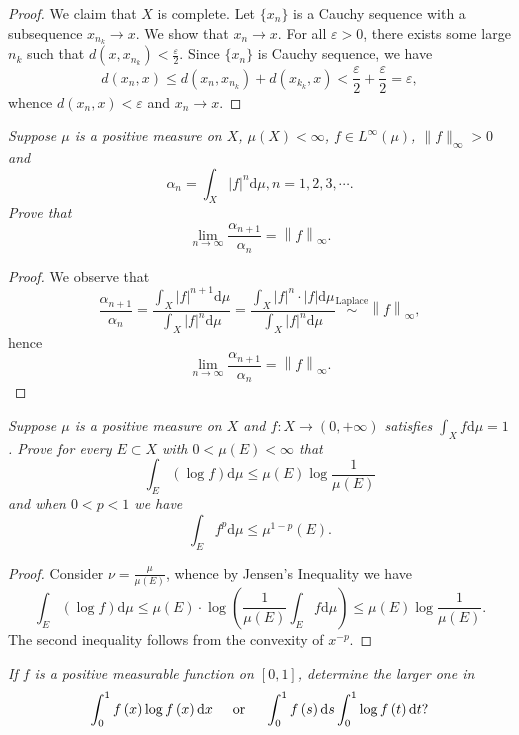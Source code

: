 \begin{proof}
We claim that $X$ is complete. Let $\{x_n\}$ is a Cauchy sequence with a subsequence $x_{n_k}\to x$. We show that $x_n\to x$. For all $\varepsilon>0$, there exists some large $n_k$ such that $d(x,x_{n_k})<\frac{\varepsilon}{2}$. Since $\{x_n\}$ is Cauchy sequence, we have 
$$
d\left( x_n,x \right) \le d\left( x_n,x_{n_k} \right) +d\left( x_{k_k},x \right) <\frac{\varepsilon}{2}+\frac{\varepsilon}{2}=\varepsilon ,
$$
whence $d(x_n,x)<\varepsilon$ and $x_n\to x$.
\end{proof}
\begin{problem}\em
Suppose $\mu$ is a positive measure on $X$, $\mu(X)<\infty$, $f\in L^\infty(\mu)$, $\|f\|_\infty>0$ and 
$$
\alpha _n=\int_X{\left| f \right|^n\mathrm{d}\mu},n=1,2,3,\cdots .
$$
Prove that 
$$
\lim_{n\rightarrow \infty} \frac{\alpha _{n+1}}{\alpha _n}=\left\| f \right\| _{\infty}.
$$
\end{problem}
\begin{proof}
We observe that 
$$
\frac{\alpha _{n+1}}{\alpha _n}=\frac{\int_X{\left| f \right|^{n+1}\mathrm{d}\mu}}{\int_X{\left| f \right|^n\mathrm{d}\mu}}=\frac{\int_X{\left| f \right|^n\cdot \left| f \right|\mathrm{d}\mu}}{\int_X{\left| f \right|^n\mathrm{d}\mu}}\overset{\text{Laplace}}{\sim}\left\| f \right\| _{\infty},
$$
hence 
$$
\lim_{n\rightarrow \infty} \frac{\alpha _{n+1}}{\alpha _n}=\left\| f \right\| _{\infty}.
$$
\end{proof}
\begin{problem}\em
Suppose $\mu$ is a positive measure on $X$ and $f:X\to(0,+\infty)$ satisfies $\int_Xf\mathrm{d}\mu=1$. Prove for every $E\subset X$ with $0<\mu(E)<\infty$ that 
$$
\int_E{\left( \log f \right) \mathrm{d}\mu}\le \mu \left( E \right) \log \frac{1}{\mu \left( E \right)}
$$
and when $0<p<1$ we have 
$$
\int_E{f^p\mathrm{d}\mu}\le \mu ^{1-p}\left( E \right) .
$$
\end{problem}
\begin{proof}
Consider $\nu=\frac{\mu}{\mu(E)}$, whence by Jensen's Inequality we have 
$$
\int_E{\left( \log f \right) \mathrm{d}\mu}\le \mu \left( E \right) \cdot \log \left( \frac{1}{\mu \left( E \right)}\int_E{f\mathrm{d}\mu} \right) \le \mu \left( E \right) \log \frac{1}{\mu \left( E \right)}.
$$
The second inequality follows from the convexity of $x^{-p}$.
\end{proof}
\begin{problem}\em
If $f$ is a positive measurable function on $[0,1]$, determine the larger one in 
$$
\int_0^1{f\left( x \right) \log f\left( x \right) \mathrm{d}x}\hspace{0.5cm}\text{or}\hspace{0.5cm}\int_0^1{f\left( s \right) \mathrm{d}s\int_0^1{\log f\left( t \right) \mathrm{d}t}}?
$$
\end{problem}
